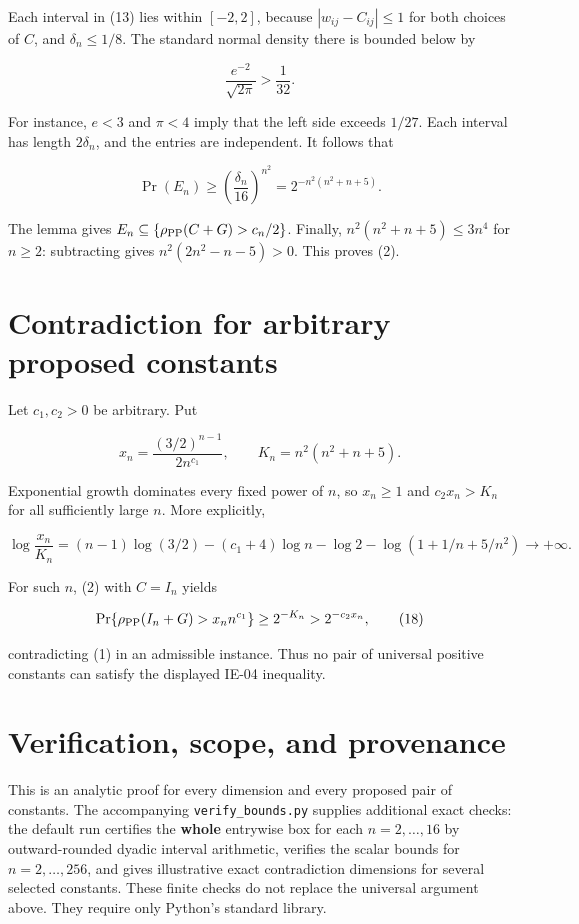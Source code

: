 \documentclass[
  11pt,
  letterpaper,
]{article}
\begin{document}
Each interval in (13) lies within \([-2,2]\), because
\(|w_{ij}-C_{ij}|\leq1\) for both choices of \(C\), and
\(\delta_n\leq1/8\). The standard normal density there is bounded below
by

\[
\frac{e^{-2}}{\sqrt{2\pi}}>\frac1{32}.
\tag{14}
\]

For instance, \(e<3\) and \(\pi<4\) imply that the left side exceeds
\(1/27\). Each interval has length \(2\delta_n\), and the entries are
independent. It follows that

\[
\Pr(E_n)\geq\left(\frac{\delta_n}{16}\right)^{n^2}
=2^{-n^2(n^2+n+5)}.
\tag{15}
\]

The lemma gives \(E_n\subseteq\{\rho_{\rm PP}(C+G)>c_n/2\}\). Finally,
\(n^2(n^2+n+5)\leq3n^4\) for \(n\geq2\): subtracting gives
\(n^2(2n^2-n-5)>0\). This proves (2).

\section{Contradiction for arbitrary proposed
constants}\label{contradiction-for-arbitrary-proposed-constants}

Let \(c_1,c_2>0\) be arbitrary. Put

\[
x_n=\frac{(3/2)^{n-1}}{2n^{c_1}},
\qquad K_n=n^2(n^2+n+5).
\tag{16}
\]

Exponential growth dominates every fixed power of \(n\), so \(x_n\geq1\)
and \(c_2x_n>K_n\) for all sufficiently large \(n\). More explicitly,

\[
\log\frac{x_n}{K_n}
=(n-1)\log(3/2)-(c_1+4)\log n-\log2
-\log(1+1/n+5/n^2)\longrightarrow+\infty.
\tag{17}
\]

For such \(n\), (2) with \(C=I_n\) yields

\[
\Pr\{\rho_{\rm PP}(I_n+G)>x_nn^{c_1}\}
\geq2^{-K_n}>2^{-c_2x_n},
\tag{18}
\]

contradicting (1) in an admissible instance. Thus no pair of universal
positive constants can satisfy the displayed IE-04 inequality.

\section{Verification, scope, and
provenance}\label{verification-scope-and-provenance}

This is an analytic proof for every dimension and every proposed pair of
constants. The accompanying \texttt{verify\_bounds.py} supplies
additional exact checks: the default run certifies the \textbf{whole}
entrywise box for each \(n=2,\ldots,16\) by outward-rounded dyadic
interval arithmetic, verifies the scalar bounds for \(n=2,\ldots,256\),
and gives illustrative exact contradiction dimensions for several
selected constants. These finite checks do not replace the universal
argument above. They require only Python's standard library.
\end{document}
